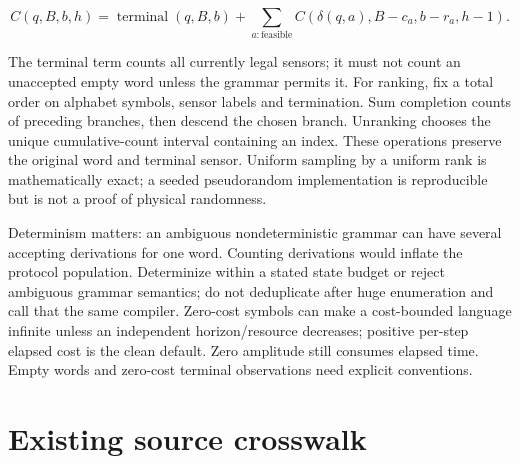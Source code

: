 \documentclass[
  11pt,
  a4paper,
]{report}
\begin{document}
\[
C(q,B,b,h)=\operatorname{terminal}(q,B,b)+\sum_{a:\mathrm{feasible}}C(\delta(q,a),B-c_a,b-r_a,h-1).
\]

The terminal term counts all currently legal sensors; it must not count
an unaccepted empty word unless the grammar permits it. For ranking, fix
a total order on alphabet symbols, sensor labels and termination. Sum
completion counts of preceding branches, then descend the chosen branch.
Unranking chooses the unique cumulative-count interval containing an
index. These operations preserve the original word and terminal sensor.
Uniform sampling by a uniform rank is mathematically exact; a seeded
pseudorandom implementation is reproducible but is not a proof of
physical randomness.

Determinism matters: an ambiguous nondeterministic grammar can have
several accepting derivations for one word. Counting derivations would
inflate the protocol population. Determinize within a stated state
budget or reject ambiguous grammar semantics; do not deduplicate after
huge enumeration and call that the same compiler. Zero-cost symbols can
make a cost-bounded language infinite unless an independent
horizon/resource decreases; positive per-step elapsed cost is the clean
default. Zero amplitude still consumes elapsed time. Empty words and
zero-cost terminal observations need explicit conventions.

\hypertarget{existing-source-crosswalk}{%
\section{Existing source crosswalk}\label{existing-source-crosswalk}}
\end{document}
